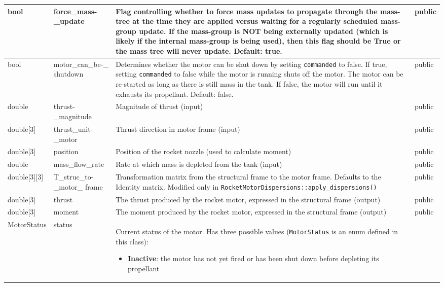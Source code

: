 \documentclass[11pt,fleqn]{report}
\begin{document}
\begin{center}
\begin{longtable}{|p{2.75cm}|p{2.8cm}|p{7.1cm}|l|}
\hline
bool & force\_mass-\newline \_update & Flag controlling whether to force mass updates to propagate through the mass-tree at the time they are applied versus waiting for a regularly scheduled mass-group update.  If the mass-group is NOT being externally updated (which is likely if the internal mass-group is being used), then this flag should be True or the mass tree will never update. Default: true. & public \\
\hline
bool & motor\_can\_be-\newline \_ shutdown & Determines whether the motor can be shut down by setting \verb|commanded| to false. If true, setting \verb|commanded| to false while the motor is running shuts off the motor. The motor can be re-started as long as there is still mass in the tank. If false, the motor will run until it exhausts its propellant. Default: false. & public \\
\hline
double & thrust-\newline \_magnitude & Magnitude of thrust (input) & public \\
\hline
double[3] & thrust\_unit-\newline \_motor & Thrust direction in motor frame (input) & public \\
\hline
double[3] & position & Position of the rocket nozzle (used to calculate moment) & public \\
\hline
double & mass\_flow\_rate & Rate at which mass is depleted from the tank (input) & public \\
\hline
double[3][3] & T\_struc\_to-\newline \_motor\_ frame & Transformation matrix from the structural frame to the motor frame. Defaults to the Identity matrix.  Modified only in \verb|RocketMotorDispersions::|\newline \verb|apply_dispersions()| & public \\
\hline
double[3] & thrust & The thrust produced by the rocket motor, expressed in the structural frame (output) & public \\
\hline
double[3] & moment & The moment produced by the rocket motor, expressed in the structural frame (output) & public \\
\hline
MotorStatus & status & Current status of the motor. Has three possible values (\verb|MotorStatus| is an enum defined in this class):
\begin{itemize}
\item \textbf{Inactive}: the motor has not yet fired or has been shut down before depleting its propellant

\end{itemize}
\end{longtable}
\end{center}
\end{document}
